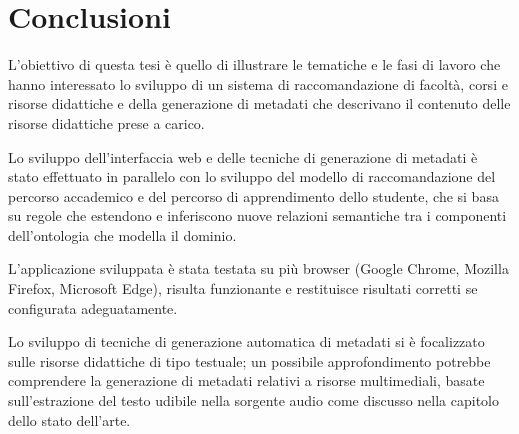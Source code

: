 \clearpage{\pagestyle{empty}\cleardoublepage}
\chapter*{Conclusioni}

L'obiettivo di questa tesi è quello di illustrare le tematiche e le fasi di lavoro che hanno interessato lo sviluppo di un sistema di raccomandazione di facoltà, corsi e risorse didattiche e della generazione di metadati che descrivano il contenuto delle risorse didattiche prese a carico.

\vspace{5mm}

Lo sviluppo dell'interfaccia web e delle tecniche di generazione di metadati è stato effettuato in parallelo con lo sviluppo del modello di raccomandazione del percorso accademico e del percorso di apprendimento dello studente, che si basa su regole
che estendono e inferiscono nuove relazioni semantiche tra i componenti dell’ontologia che modella il dominio.

\vspace{5mm}

L'applicazione sviluppata è stata testata su più browser (Google Chrome, Mozilla Firefox, Microsoft Edge), risulta funzionante e restituisce risultati corretti se configurata adeguatamente.

Lo sviluppo di tecniche di generazione automatica di metadati si è focalizzato sulle risorse didattiche di tipo testuale; un possibile approfondimento potrebbe comprendere la generazione di metadati relativi a risorse multimediali, basate sull'estrazione del testo udibile nella sorgente audio come discusso nella capitolo dello stato dell'arte.

